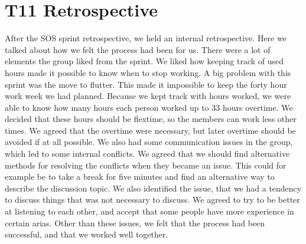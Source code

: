 \section{T11 Retrospective}
After the SOS sprint retrospective, we held an internal retrospective. 
Here we talked about how we felt the process had been for us. 
There were a lot of elements the group liked from the sprint. 
We liked how keeping track of used hours made it possible to know when to stop working. 
A big problem with this sprint was the move to flutter. This made it impossible to keep the forty hour work week we had planned. 
Because we kept track with hours worked, we were able to know how many hours each person worked up to 33 hours overtime. We decided that these hours should be flextime, so the members can work less other times. 
We agreed that the overtime were necessary, but later overtime should be avoided if at all possible.
We also had some communication issues in the group, which led to some internal conflicts. We agreed that we should find alternative methods for resolving the conflicts when they became an issue. This could for example be to take a break for five minutes and find an alternative way to describe the discussion topic. 
We also identified the issue, that we had a tendency to discuss things that was not necessary to discuss. We agreed to try to be better at listening to each other, and accept that some people have more experience in certain arias. 
Other than these issues, we felt that the process had been successful, and that we worked well together.
